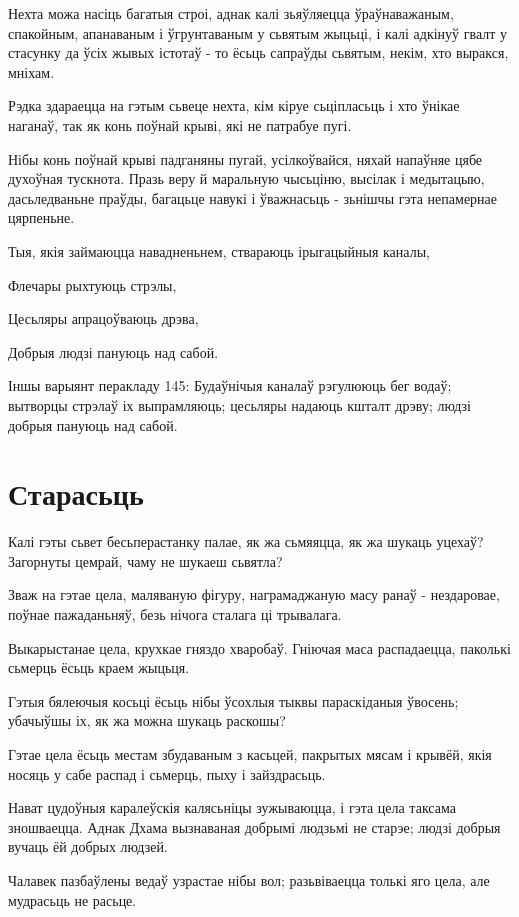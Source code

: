 \documentclass{article}
\begin{document}
Нехта можа насіць багатыя строі, аднак калі зьяўляецца
ўраўнаважаным, спакойным, апанаваным і ўгрунтаваным у сьвятым жыцьці, і
калі адкінуў гвалт у стасунку да ўсіх жывых істотаў - то ёсьць сапраўды
сьвятым, некім, хто выракся, мніхам.

Рэдка здараецца на гэтым сьвеце нехта, кім кіруе сьціпласьць і хто
ўнікае наганаў, так як конь поўнай крыві, які не патрабуе пугі.

Нібы конь поўнай крыві падганяны пугай, усілкоўвайся, няхай
напаўняе цябе духоўная тускнота. Празь веру й маральную чысьціню,
высілак і медытацыю, дасьледваньне праўды, багацьце навукі і ўважнасьць
- зьнішчы гэта непамернае цярпеньне.

Тыя, якія займаюцца навадненьнем, ствараюць ірыгацыйныя каналы,

Флечары рыхтуюць стрэлы,

Цесьляры апрацоўваюць дрэва,

Добрыя людзі пануюць над сабой.

Іншы варыянт перакладу 145: Будаўнічыя каналаў рэгулююць бег водаў;
вытворцы стрэлаў іх выпрамляюць; цесьляры надаюць кшталт дрэву; людзі
добрыя пануюць над сабой.

\section{Старасьць}

Калі гэты сьвет бесьперастанку палае, як жа сьмяяцца, як жа шукаць
уцехаў? Загорнуты цемрай, чаму не шукаеш сьвятла?

Зваж на гэтае цела, маляваную фігуру, награмаджаную масу ранаў -
нездаровае, поўнае пажаданьняў, безь нічога сталага ці трывалага.

Выкарыстанае цела, крухкае гняздо хваробаў. Гніючая маса
распадаецца, паколькі сьмерць ёсьць краем жыцьця.

Гэтыя бялеючыя косьці ёсьць нібы ўсохлыя тыквы параскіданыя
ўвосень; убачыўшы іх, як жа можна шукаць раскошы?

Гэтае цела ёсьць местам збудаваным з касьцей, пакрытых мясам і
крывёй, якія носяць у сабе распад і сьмерць, пыху і зайздрасьць.

Нават цудоўныя каралеўскія калясьніцы зужываюцца, і гэта цела
таксама зношваецца. Аднак Дхама вызнаваная добрымі людзьмі не старэе;
людзі добрыя вучаць ёй добрых людзей.

Чалавек пазбаўлены ведаў узрастае нібы вол; разьвіваецца толькі яго
цела, але мудрасьць не расьце.
\end{document}
